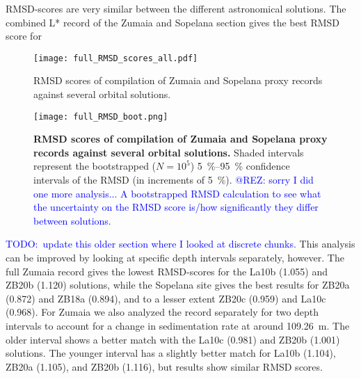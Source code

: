 \documentclass[draft]{agujournal2019}
\newcommand{\ijk}{\textcolor{blue}}
\begin{document}
\gls{RMSD}-scores are very similar between the different astronomical solutions.
The combined \gls{L*} record of the Zumaia and Sopelana section gives the best \gls{RMSD} score for

\setcounter{figure}{2000}
\begin{figure}[htb]
    \centering
    \texttt{[image: full\_RMSD\_scores\_all.pdf]}
    \caption{\label{fig:full-RMSD-all}
        \gls{RMSD} scores of compilation of Zumaia and Sopelana proxy records against several orbital solutions.
    }
\end{figure}

\setcounter{figure}{2001}
\begin{figure}[htb]
    \centering
    \texttt{[image: full\_RMSD\_boot.png]}
    \caption{\label{fig:full-RMSD-boot}
        \textbf{\gls{RMSD} scores of compilation of Zumaia and Sopelana proxy records against several orbital solutions.}
        Shaded intervals represent the bootstrapped (\(N = 10^{5}\)) \qtyrange{5}{95}{\percent} confidence intervals of the \gls{RMSD} (in increments of \qty{5}{\percent}).
        \ijk{@REZ: sorry I did one more analysis... A bootstrapped RMSD calculation to see what the uncertainty on the RMSD score is/how significantly they differ between solutions.}
    }
\end{figure}

\ijk{TODO:\ update this older section where I looked at discrete chunks.}
This analysis can be improved by looking at specific depth intervals separately, however.
The full Zumaia record gives the lowest \gls{RMSD}-scores for the La10b (\num{1.055}) and ZB20b (\num{1.120}) solutions,
while the Sopelana site gives the best results for ZB20a (\num{0.872}) and ZB18a (\num{0.894}), and to a lesser extent ZB20c (\num{0.959}) and La10c (\num{0.968}).
For Zumaia we also analyzed the record separately for two depth intervals to account for a change in sedimentation rate at around \qty{109.26}{\metre}.
The older interval shows a better match with the La10c (\num{0.981}) and ZB20b (1.001) solutions.
The younger interval has a slightly better match for La10b (\num{1.104}), ZB20a (\num{1.105}), and ZB20b (\num{1.116}), but results show similar \gls{RMSD} scores.
\end{document}
